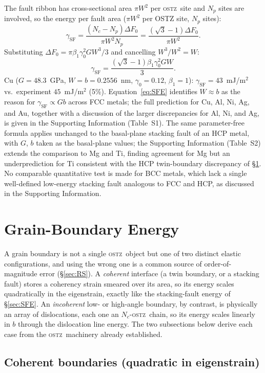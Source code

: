 \documentclass[5p,sort&compress]{elsarticle}
\newcommand{\OSTZ}{\textsc{ostz}}
\newcommand{\dF}{\Delta F_0}
\newcommand{\gz}{\gamma_0}
\begin{document}
The fault ribbon has cross-sectional area $\pi W^2$ per \OSTZ\ site
and $N_p$ sites are involved, so the energy per fault area
($\pi W^2$ per OSTZ site, $N_p$ sites):
\[
  \gamma_\text{SF}=\frac{(N_c-N_p)\dF}{\pi W^2 N_p}
  =\frac{(\sqrt3-1)\dF}{\pi W^2}.
\]
Substituting $\dF=\pi\beta_1\gz^2GW^3/3$ and cancelling
$W^3/W^2=W$:
\begin{equation}
  \boxed{\gamma_\text{SF}=\frac{(\sqrt3-1)\beta_1\gz^2GW}{3}.}
  \label{eq:SFE}
\end{equation}
Cu ($G=48.3$~GPa, $W=b=0.2556$~nm, $\gz=0.12$, $\beta_1=1$):
$\gamma_\text{SF}=43$~mJ/m$^2$ vs.\ experiment $45$~mJ/m$^2$ (5\%).
Equation~\eqref{eq:SFE} identifies $W\approx b$ as the reason for
$\gamma_\text{SF}\propto Gb$ across FCC metals; the full prediction
for Cu, Al, Ni, Ag, and Au, together with a discussion of the larger
discrepancies for Al, Ni, and Ag, is given in the Supporting
Information (Table~S1). The same parameter-free formula applies
unchanged to the basal-plane stacking fault of an HCP metal, with
$G$, $b$ taken as the basal-plane values; the Supporting Information
(Table~S2) extends the comparison to Mg and Ti, finding agreement for
Mg but an underprediction for Ti consistent with the HCP twin-boundary
discrepancy of \S\ref{sec:gb}. No comparable quantitative test is made for BCC metals, which lack a
single well-defined low-energy stacking fault analogous to FCC and
HCP, as discussed in the Supporting Information.

\section{Grain-Boundary Energy}
\label{sec:gb}

A grain boundary is not a single \OSTZ\ object but one of two
distinct elastic configurations, and using the wrong one is a
common source of order-of-magnitude error (\S\ref{sec:RS}).
A \emph{coherent} interface (a twin boundary, or a stacking fault)
stores a coherency strain smeared over its area, so its energy
scales quadratically in the eigenstrain, exactly like the
stacking-fault energy of \S\ref{sec:SFE}. An \emph{incoherent}
low- or high-angle boundary, by contrast, is physically an array of
dislocations, each one an $N_c$-\OSTZ\ chain, so its energy scales
linearly in $b$ through the dislocation line energy. The two
subsections below derive each case from the \OSTZ\ machinery
already established.

\subsection{Coherent boundaries (quadratic in eigenstrain)}
\end{document}
